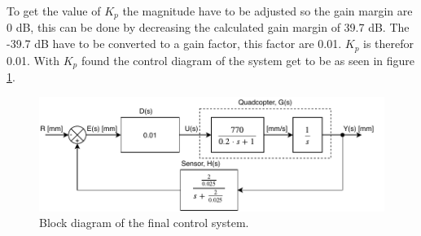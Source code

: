 \newline
To get the value of $K_p$ the magnitude have to be adjusted so the gain margin are 0 dB, this can be done by decreasing the calculated gain margin of 39.7 dB.
The -39.7 dB have to be converted to a gain factor, this factor are 0.01. $K_p$ is therefor 0.01.
With $K_p$ found the control diagram of the system get to be as seen in figure \ref{fig:dec_Final_block_diagram}.

\begin{figure}[H]
    \centering
    \includegraphics[width=\textwidth]{figures/ch_design/controller/FinalControlDiagram.pdf}
    \caption{Block diagram of the final control system.}
    \label{fig:dec_Final_block_diagram}
\end{figure}






